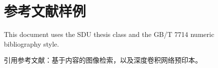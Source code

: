 \documentclass[print]{sduthesis}
\begin{document}
\chapter*{参考文献样例}

This document uses the SDU thesis class and the GB/T 7714 numeric
bibliography style.

引用参考文献：基于内容的图像检索\cite{smeulders2000content}，以及深度卷积网络预印本\cite{simonyan2014verydeep}。



\end{document}
